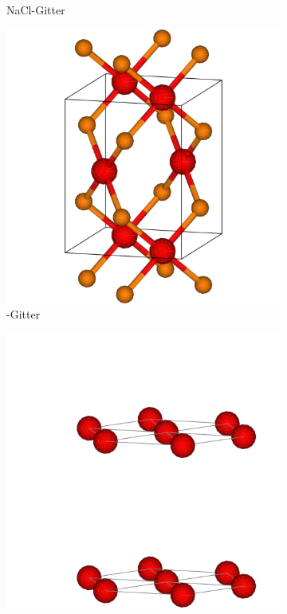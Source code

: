 \begin{figure}
\begin{subfigure}[t]{0.3\textwidth}
        \caption{NaCl-Gitter} \label{nacl}
    \end{subfigure}
    \begin{subfigure}[t]{0.3\textwidth}
        \centering
        \includegraphics[width=\textwidth]{../assets/theorie/CuO}
        \caption{-Gitter} \label{cuo}
    \end{subfigure}
    \begin{subfigure}[t]{0.3\textwidth}
        \centering
        \includegraphics[width=\textwidth]{../assets/theorie/hex}

\end{subfigure}
\end{figure}
